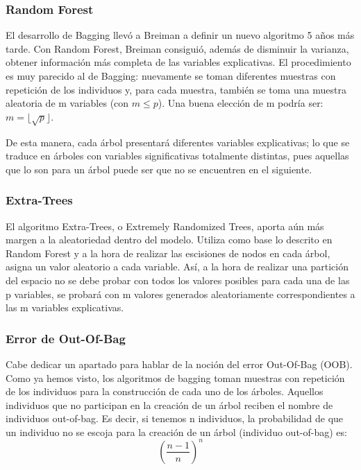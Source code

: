 \documentclass[12pt,twoside]{article}
\begin{document}
\subsubsection{Random Forest}
El desarrollo de Bagging llevó a Breiman a definir un nuevo algoritmo 5 años más tarde. Con Random Forest, Breiman consiguió, además de disminuir la varianza, obtener información más completa de las variables explicativas. El procedimiento es muy parecido al de Bagging: nuevamente se toman diferentes muestras con repetición de los individuos y, para cada muestra, también se toma una muestra aleatoria de m variables (con $m \leq p$). Una buena elección de m podría ser: $ m = \lfloor \sqrt{p} \rfloor$.

De esta manera, cada árbol presentará diferentes variables explicativas; lo que se traduce en árboles con variables significativas totalmente distintas, pues aquellas que lo son para un árbol puede ser que no se encuentren en el siguiente.


\subsubsection{Extra-Trees}
El algoritmo Extra-Trees, o Extremely Randomized Trees, aporta aún más margen a la aleatoriedad dentro del modelo. Utiliza como base lo descrito en Random Forest y a la hora de realizar las escisiones de nodos en cada árbol, asigna un valor aleatorio a cada variable. Así, a la hora de realizar una partición del espacio no se debe probar con todos los valores posibles para cada una de las p variables, se probará con m valores generados aleatoriamente correspondientes a las m variables explicativas.


\subsubsection{Error de Out-Of-Bag}
Cabe dedicar un apartado para hablar de la noción del error Out-Of-Bag (OOB). Como ya hemos visto, los algoritmos de bagging toman muestras con repetición de los individuos para la construcción de cada uno de los árboles. Aquellos individuos que no participan en la creación de un árbol reciben el nombre de individuos out-of-bag. Es decir, si tenemos n individuos, la probabilidad de que un individuo no se escoja para la creación de un árbol (individuo out-of-bag) es:
\begin{equation*}
\left( \frac{n-1}{n} \right)^n
\end{equation*}
\end{document}

